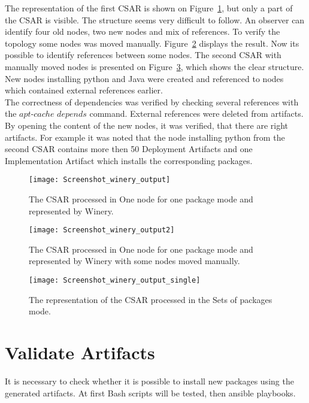 The representation of the first CSAR is shown on Figure~\ref{fig:winery_output}, but only a part of the CSAR is visible.
The structure seems very difficult to follow.
An observer can identify four old nodes, two new nodes and mix of references.
 To verify the topology some nodes was moved manually. 
 Figure~\ref{fig:winery_output2} displays the result. 
 Now its possible to identify references between some nodes.
The second CSAR with manually moved nodes is presented on Figure~\ref{fig:winery_output_single}, which shows the clear structure.
New nodes installing python and Java were created and referenced to nodes which contained external references earlier.\\
 The correctness of dependencies was verified by checking several references with the $apt$-$cache$ $depends$ command.
External references were deleted from artifacts.
By opening the content of the new nodes, it was verified, that there are right artifacts.
For example it was noted that the node installing python from the second CSAR contains more then 50 Deployment Artifacts and one Implementation Artifact which installs the corresponding packages.
 \begin{figure}[ht]   
 	\centering
 	\texttt{[image: Screenshot\_winery\_output]}  
 	\caption{The CSAR processed in One node for one package mode and represented by Winery.}
 	\label{fig:winery_output}
 \end{figure}
 \begin{figure}[ht]   
 	\centering
 	\texttt{[image: Screenshot\_winery\_output2]}
 	\caption{The CSAR processed in One node for one package mode and represented by Winery with some nodes moved manually.}
 	\label{fig:winery_output2}
 \end{figure}
\begin{figure}[ht]   
	\centering
	\texttt{[image: Screenshot\_winery\_output\_single]}
	\caption{The representation of the CSAR processed in the Sets of packages mode.}
	\label{fig:winery_output_single}
\end{figure}
\section{Validate Artifacts}\label{sec:checkart}
It is necessary to check whether it is possible to install new packages using the generated artifacts.
At first Bash scripts will be tested, then ansible playbooks.

